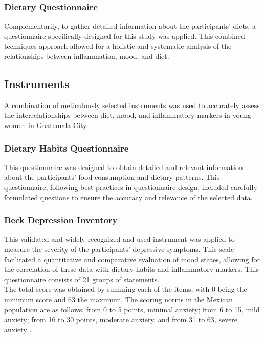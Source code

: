 \documentclass[jou]{apa7}
\begin{document}
\subsubsection{Dietary Questionnaire}
Complementarily, to gather detailed information about the participants' diets, a questionnaire specifically designed for this study was applied. This combined techniques approach allowed for a holistic and systematic analysis of the relationships between inflammation, mood, and diet.


\subsection{Instruments}\label{instrumentos}

A combination of meticulously selected instruments was used to accurately assess the interrelationships between diet, mood, and inflammatory markers in young women in Guatemala City.\\

\subsubsection{Dietary Habits Questionnaire}
This questionnaire was designed to obtain detailed and relevant information about the participants' food consumption and dietary patterns. This questionnaire, following best practices in questionnaire design, included carefully formulated questions to ensure the accuracy and relevance of the selected data.\\

\subsubsection{Beck Depression Inventory}
This validated and widely recognized and used instrument was applied to measure the severity of the participants' depressive symptoms. This scale facilitated a quantitative and comparative evaluation of mood states, allowing for the correlation of these data with dietary habits and inflammatory markers. This questionnaire consists of 21 groups of statements.\\

The total score was obtained by summing each of the items, with 0 being the minimum score and 63 the maximum. The scoring norms in the Mexican population are as follows: from 0 to 5 points, minimal anxiety; from 6 to 15, mild anxiety; from 16 to 30 points, moderate anxiety, and from 31 to 63, severe anxiety \parencite{beckDepressionCausesTreatment2009}.\\
\end{document}
